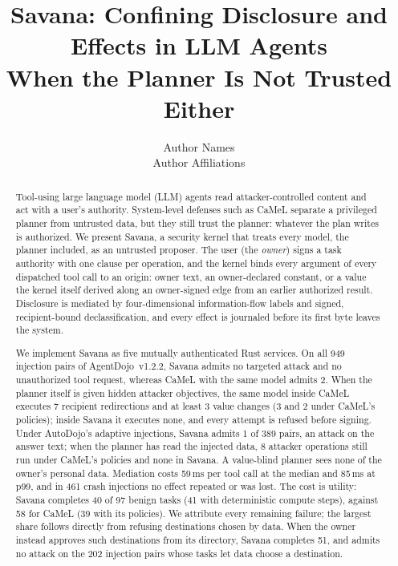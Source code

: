 \documentclass[letterpaper,twocolumn,10pt]{article}
\newif\ifanonymous
\newcommand{\sys}{Savana}
\begin{document}
\date{}

\title{\Large \bf \sys{}: Confining Disclosure and Effects in LLM Agents\\
  \large When the Planner Is Not Trusted Either}

\ifanonymous
\author{
  {\rm Anonymous Author(s)}\\
  Submission to USENIX Security '27
}
\else
\author{
  {\rm Author Names}\\
  Author Affiliations
}
\fi

\maketitle

\begin{abstract}
Tool-using large language model (LLM) agents read attacker-controlled
content and act with a user's authority. System-level defenses such as
CaMeL separate a privileged planner from untrusted data, but they still
trust the planner: whatever the plan writes is authorized. We present
\sys{}, a security kernel that treats every model, the planner included, as
an untrusted proposer. The user (the \emph{owner}) signs a task authority
with one clause per operation, and the kernel binds every argument of every
dispatched tool call to an origin: owner text, an owner-declared constant,
or a value the kernel itself derived along an owner-signed edge from an
earlier authorized result. Disclosure is mediated by four-dimensional
information-flow labels and signed, recipient-bound declassification, and
every effect is journaled before its first byte leaves the system.

We implement \sys{} as five mutually authenticated Rust services. On all
949 injection pairs of AgentDojo~v1.2.2, \sys{} admits no targeted attack and
no unauthorized tool request, whereas CaMeL with the same model admits 2.
When the planner itself is given hidden attacker objectives, the same model
inside CaMeL executes 7 recipient redirections and at least 3 value changes
(3 and 2 under CaMeL's policies); inside \sys{} it executes none, and every
attempt is refused before signing. Under AutoDojo's adaptive injections,
\sys{} admits 1 of 389 pairs, an attack on the answer text; when the
planner has read the injected data, 8 attacker operations still run under
CaMeL's policies and none in \sys{}. A value-blind planner sees none of the
owner's personal data. Mediation costs 59\,ms per tool call at the median
and 85\,ms at p99, and in 461 crash injections no effect repeated or was
lost. The cost is utility: \sys{} completes 40 of 97 benign
tasks (41 with deterministic compute steps), against 58 for CaMeL (39
with its policies). We attribute every remaining failure; the largest share
follows directly from refusing destinations chosen by data. When the owner
instead approves such destinations from its directory, \sys{} completes
51, and admits no attack on the 202 injection pairs whose tasks let data
choose a destination.
\end{abstract}
\end{document}
